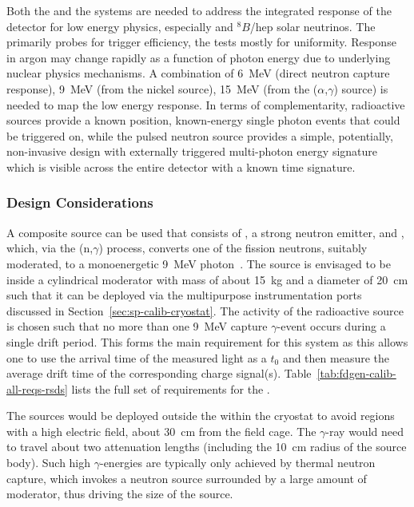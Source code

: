 Both the  and the  systems are needed to address the integrated response of the detector for low energy physics, especially  and $^{8}B$/hep solar neutrinos. 
The  primarily probes for trigger efficiency, the  tests mostly for uniformity. Response in argon may change rapidly as a function of photon energy due to underlying nuclear physics mechanisms. A combination of \SI{6}{\MeV} (direct neutron capture response), \SI{9}{\MeV} (from the nickel source),
\SI{15}{\MeV} (from the ($\alpha$,$\gamma$) source)
is needed to map the low energy response. In terms of complementarity, radioactive sources provide a known position, known-energy single photon events that could be triggered on, while the pulsed neutron source provides a simple, potentially, non-invasive design with externally triggered multi-photon energy signature which is visible across the entire detector with a known time signature.


\subsubsection{Design Considerations}

A composite source can be used that consists of , a strong neutron emitter, and , which, via the (n,$\gamma$) process, converts one of the 
 fission neutrons, suitably moderated, to a monoenergetic \SI{9}{\MeV} photon~\cite{Rogers:1996ks}. 
The source is envisaged to be inside a cylindrical moderator with mass of about \SI{15}{\kg} and a diameter of \SI{20}{\cm} such that it can be deployed via the multipurpose instrumentation ports discussed in Section~\ref{sec:sp-calib-cryostat}. The activity of the radioactive source is chosen such that no more than one \SI{9}{\MeV} capture $\gamma$-event occurs during a single drift period. This forms the main requirement for this system as this allows one to use the arrival time of the measured light as a $t_0$ and then measure the average drift time of the corresponding charge signal(s). Table~\ref{tab:fdgen-calib-all-reqs-rsds} lists the full set of requirements for the .

The sources would be deployed outside the  within the cryostat to avoid regions with a high electric field, about \SI{30}{\cm} from the field cage. The $\gamma$-ray would need to travel about two attenuation lengths (including the \SI{10}{\cm} radius of the source body). Such high $\gamma$-energies are typically only achieved by thermal neutron capture, which invokes a neutron source surrounded by a large amount of moderator, thus driving the size of the source.

